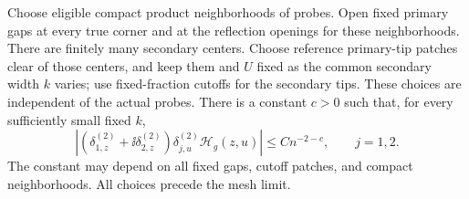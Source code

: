 \begin{proposition}
\label{prop:obs-mixed}
Choose eligible compact product neighborhoods of probes.
Open fixed primary gaps at every true corner and at the
reflection openings for these neighborhoods.  There are finitely
many secondary centers.  Choose reference primary-tip patches clear
of those centers, and keep them and $U$ fixed as the common
secondary width $k$ varies; use fixed-fraction cutoffs for the
secondary tips.  These choices are independent of the actual probes.
There is a constant $c>0$ such that, for every sufficiently small
fixed $k$,
\begin{equation}
 \left| (\delta_{1,z}^{(2)}+\ii\delta_{2,z}^{(2)})
                \delta_{j,u}^{(2)}\mathcal H_g(z,u)\right|
       \le C n^{-2-c},\qquad j=1,2.
 \label{obs:mixed-saving}
\end{equation}
The constant may depend on all fixed gaps, cutoff
patches, and compact neighborhoods.  All choices precede the mesh limit.
\end{proposition}


